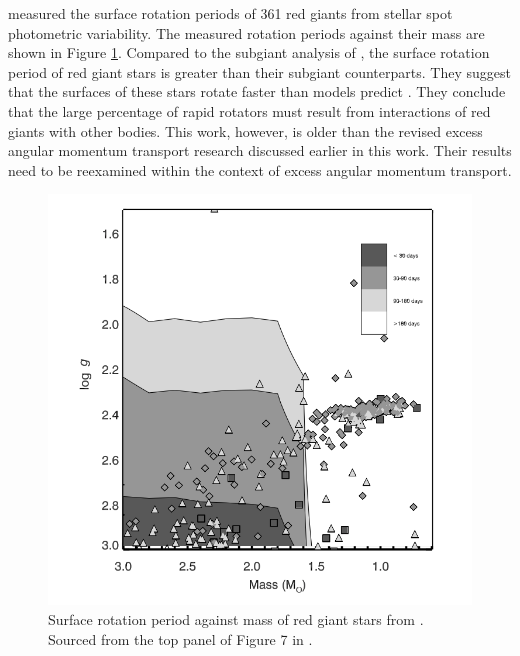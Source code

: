\citet{ceillier_surface_2017} measured the surface rotation periods of 361 red giants from stellar spot photometric variability.
The measured rotation periods against their mass are shown in Figure \ref{fig:rgb_surface}.
Compared to the subgiant analysis of \citet{santos_surface_2021}, the surface rotation period of red giant stars is greater than their subgiant counterparts.
They suggest that the surfaces of these stars rotate faster than models predict \citep{tayar_rapid_2015}.
They conclude that the large percentage of rapid rotators must result from interactions of red giants with other bodies.
This work, however, is older than the revised excess angular momentum transport research discussed earlier in this work.
Their results need to be reexamined within the context of excess angular momentum transport.

\begin{figure}[h]
    \includegraphics[width=\textwidth]{Figures/intro_figures/rgb_surface.png}
    \caption[Surface rotation period distribution of red giant stars.]{Surface rotation period against mass of red giant stars from \citet{ceillier_surface_2017}.
    Sourced from the top panel of Figure 7 in \citet{ceillier_surface_2017}.}
    \label{fig:rgb_surface}
\end{figure}


